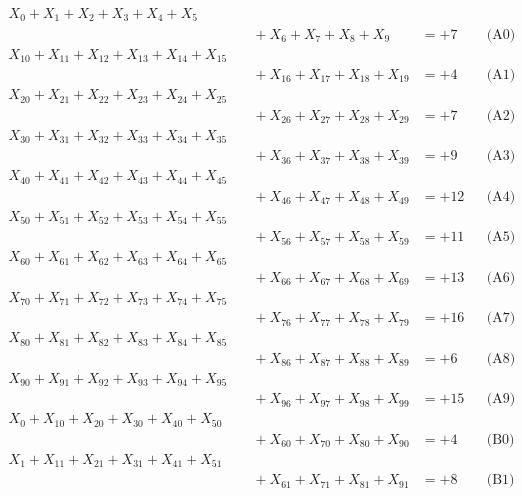 \documentclass[a4paper,10pt]{article}
\begin{document}
\allowdisplaybreaks
{\small
\begin{align}
X_{0} + X_{1} + X_{2} + X_{3} + X_{4} + X_{5} \\[0.1ex]
&\quad  + X_{6} + X_{7} + X_{8} + X_{9} &= +7 && \text{(A0)} \\
X_{10} + X_{11} + X_{12} + X_{13} + X_{14} + X_{15} \\[0.1ex]
&\quad  + X_{16} + X_{17} + X_{18} + X_{19} &= +4 && \text{(A1)} \\
X_{20} + X_{21} + X_{22} + X_{23} + X_{24} + X_{25} \\[0.1ex]
&\quad  + X_{26} + X_{27} + X_{28} + X_{29} &= +7 && \text{(A2)} \\
X_{30} + X_{31} + X_{32} + X_{33} + X_{34} + X_{35} \\[0.1ex]
&\quad  + X_{36} + X_{37} + X_{38} + X_{39} &= +9 && \text{(A3)} \\
X_{40} + X_{41} + X_{42} + X_{43} + X_{44} + X_{45} \\[0.1ex]
&\quad  + X_{46} + X_{47} + X_{48} + X_{49} &= +12 && \text{(A4)} \\
\allowbreak
X_{50} + X_{51} + X_{52} + X_{53} + X_{54} + X_{55} \\[0.1ex]
&\quad  + X_{56} + X_{57} + X_{58} + X_{59} &= +11 && \text{(A5)} \\
X_{60} + X_{61} + X_{62} + X_{63} + X_{64} + X_{65} \\[0.1ex]
&\quad  + X_{66} + X_{67} + X_{68} + X_{69} &= +13 && \text{(A6)} \\
X_{70} + X_{71} + X_{72} + X_{73} + X_{74} + X_{75} \\[0.1ex]
&\quad  + X_{76} + X_{77} + X_{78} + X_{79} &= +16 && \text{(A7)} \\
X_{80} + X_{81} + X_{82} + X_{83} + X_{84} + X_{85} \\[0.1ex]
&\quad  + X_{86} + X_{87} + X_{88} + X_{89} &= +6 && \text{(A8)} \\
X_{90} + X_{91} + X_{92} + X_{93} + X_{94} + X_{95} \\[0.1ex]
&\quad  + X_{96} + X_{97} + X_{98} + X_{99} &= +15 && \text{(A9)} \\
\allowbreak
X_{0} + X_{10} + X_{20} + X_{30} + X_{40} + X_{50} \\[0.1ex]
&\quad  + X_{60} + X_{70} + X_{80} + X_{90} &= +4 && \text{(B0)} \\
X_{1} + X_{11} + X_{21} + X_{31} + X_{41} + X_{51} \\[0.1ex]
&\quad  + X_{61} + X_{71} + X_{81} + X_{91} &= +8 && \text{(B1)} \\

\end{align}}
\end{document}
